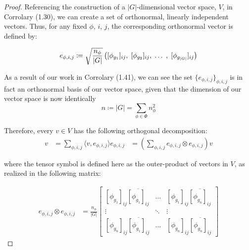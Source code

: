 \documentclass[10pt]{ucthesis}
\begin{document}
\noindent \begin{proof} Referencing the construction of a $|G|$-dimensional vector space, $V$, in Corrolary (1.30), we can create a set of orthonormal, linearly independent vectors. Thus, for any fixed $\phi$, $i$, $j$, the corresponding orthonormal vector is defined by:

\begin{equation}
	\begin{aligned}
		e_{\phi,i,j} \coloneq \sqrt{\frac{n_\phi}{|G|}}\left([\phi_{g_1}]_{ij},\hspace{1mm} [\phi_{g_2}]_{ij}, \hspace{1mm}\hdots \hspace{1mm},\hspace{1mm} [\phi_{g_{|G|}}]_{ij}\right)
	\end{aligned}
\end{equation}

As a result of our work in Corrolary (1.41), we can see the set $\{e_{\phi,i,j}\}_{\phi,i,j}$ is in fact an orthonormal basis of our vector space, given that the dimension of our vector space is now identically 
$$n \coloneq |G| = \sum_{\phi\in \Phi} n_\phi^2$$

Therefore, every $v\in V$ has the following orthogonal decomposition:
\begin{equation}
	\begin{aligned}
		v &= \sum_{\phi,i,j} \langle v , e_{\phi,i,j} \rangle e_{\phi,i,j} &= \left(\sum_{\phi,i,j} e_{\phi,i,j} \otimes e_{\phi,i,j}\right) v
	\end{aligned}
\end{equation}

where the tensor symbol is defined here as the outer-product of vectors in $V$, as realized in the following matrix:

\begin{equation}
	\begin{aligned}
		e_{\phi,i,j} \otimes e_{\phi,i,j} &= \frac{n_\phi}{|G|}\begin{bmatrix}
			[\phi_{g_1}]_{ij}\overline{[\phi_{g_1}]_{ij}} & \hdots & [\phi_{g_1}]_{ij}\overline{[\phi_{g_n}]_{ij}}\\
			\vdots & \ddots & \vdots\\
			[\phi_{g_n}]_{ij}\overline{[\phi_{g_1}]_{ij}} & \hdots & [\phi_{g_n}]_{ij}\overline{[\phi_{g_n}]_{ij}}
		\end{bmatrix}
	\end{aligned}
\end{equation}


\end{proof}
\end{document}
